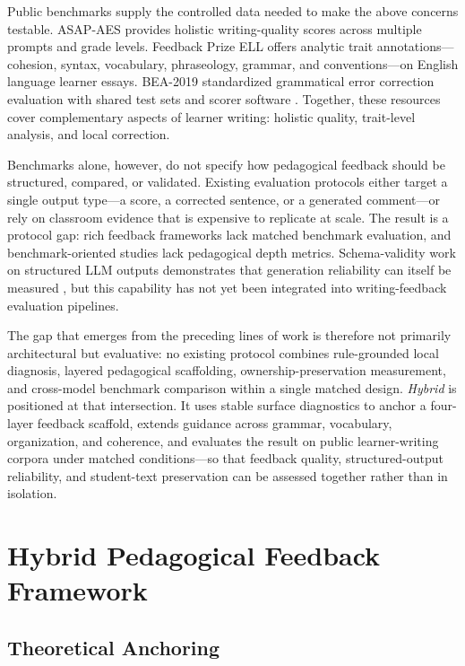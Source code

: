 \documentclass[preprint,12pt]{elsarticle}
\begin{document}
Public benchmarks supply the controlled data needed to make the above concerns testable. ASAP-AES provides holistic writing-quality scores across multiple prompts and grade levels. Feedback Prize ELL offers analytic trait annotations---cohesion, syntax, vocabulary, phraseology, grammar, and conventions---on English language learner essays. BEA-2019 standardized grammatical error correction evaluation with shared test sets and scorer software \cite{bryant2019bea}. Together, these resources cover complementary aspects of learner writing: holistic quality, trait-level analysis, and local correction.

Benchmarks alone, however, do not specify how pedagogical feedback should be structured, compared, or validated. Existing evaluation protocols either target a single output type---a score, a corrected sentence, or a generated comment---or rely on classroom evidence that is expensive to replicate at scale. The result is a protocol gap: rich feedback frameworks lack matched benchmark evaluation, and benchmark-oriented studies lack pedagogical depth metrics. Schema-validity work on structured LLM outputs demonstrates that generation reliability can itself be measured \cite{geng2025jsonschemabench}, but this capability has not yet been integrated into writing-feedback evaluation pipelines.

The gap that emerges from the preceding lines of work is therefore not primarily architectural but evaluative: no existing protocol combines rule-grounded local diagnosis, layered pedagogical scaffolding, ownership-preservation measurement, and cross-model benchmark comparison within a single matched design. \textit{Hybrid} is positioned at that intersection. It uses stable surface diagnostics to anchor a four-layer feedback scaffold, extends guidance across grammar, vocabulary, organization, and coherence, and evaluates the result on public learner-writing corpora under matched conditions---so that feedback quality, structured-output reliability, and student-text preservation can be assessed together rather than in isolation.

\section{Hybrid Pedagogical Feedback Framework}

\subsection{Theoretical Anchoring}
\end{document}
